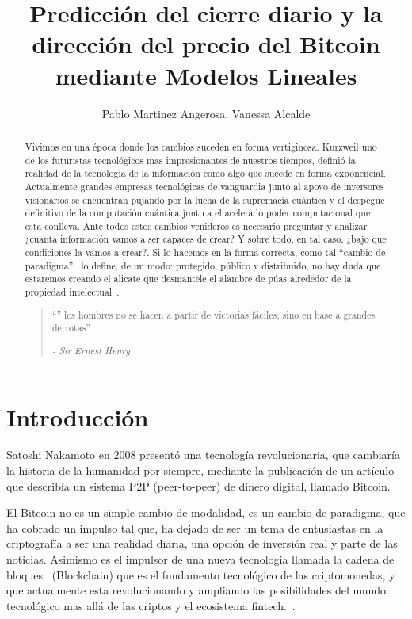 \documentclass[a4paper,12pt,twocolumn]{article}
\date{ }
\title{\textbf{Predicción del cierre diario y la dirección del precio del Bitcoin mediante Modelos Lineales}}
\author{Pablo Martinez Angerosa, Vanessa Alcalde}
\begin{document}
\onecolumn

\maketitle
\begin{abstract}
Vivimos en una época donde los cambios suceden en forma vertiginosa. Kurzweil\cite{RayKurzweil} uno de los futuristas tecnológicos mas impresionantes de nuestros tiempos, definió la realidad de la tecnología de la información como algo que sucede en forma exponencial. Actualmente grandes empresas tecnológicas de vanguardia junto al apoyo de inversores visionarios se encuentran pujando por la lucha de la supremacía cuántica y el despegue definitivo de la computación cuántica junto a el  acelerado poder computacional que esta conlleva. Ante todos estos cambios venideros es necesario preguntar y analizar ¿cuanta información vamos a ser capaces de crear? Y sobre todo, en tal caso, ¿bajo que condiciones la vamos a crear?. Si lo hacemos en la forma correcta, como tal “cambio de paradigma”~\cite{LaSingularidad} lo define, de un modo: protegido, público y distribuido,  no hay duda que estaremos creando el alicate que desmantele el alambre de púas alrededor de la propiedad intelectual~\cite{ManifestoCriptoAnarquista}.
\begin{quotation}
“” los hombres no se hacen a partir de victorias fáciles, sino en base a grandes derrotas”
\begin{flushright}
{\it - Sir Ernest Henry }
\end{flushright}
\end{quotation}

\end{abstract}
\vspace{1.0cm}

\twocolumn

\section{Introducción}
 Satoshi Nakamoto en 2008 presentó una tecnología revolucionaria\cite{Satoshi}, que cambiaría la historia de la humanidad por siempre, mediante la publicación de un artículo que describía un sistema P2P (peer-to-peer) de dinero digital, llamado Bitcoin. 

El Bitcoin no es un simple cambio de modalidad, es un cambio de paradigma, que ha cobrado un impulso tal que, ha dejado de ser un tema de entusiastas en la criptografía a ser una realidad diaria, una opción de inversión real y parte de las noticias. Asimismo es el impulsor de una nueva tecnología llamada la cadena de bloques~\cite{Blockchain} (Blockchain) que es el fundamento tecnológico de las criptomonedas,  y que actualmente esta revolucionando y ampliando las posibilidades del mundo tecnológico mas allá de las criptos y el ecosistema fintech.~\cite{Bitcoin_revolucion_monetaria}. 
\end{document}
